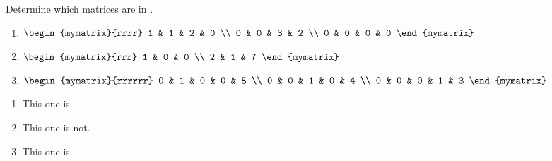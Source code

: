 \begin{enumialphparenastyle}
\begin{ex} Determine which matrices are in {\ef}. 

\begin{enumerate}
\item $\begin{mymatrix}{rrrr}
1 & 1 & 2 & 0 \\
0 & 0 & 3 & 2 \\
0 & 0 & 0 & 0
\end{mymatrix} $

\item $\begin{mymatrix}{rrr}
1 & 0 & 0 \\
2 & 1 & 7
\end{mymatrix} $

\item $\begin{mymatrix}{rrrrrr}
0 & 1 & 0 & 0 & 5 \\
0 & 0 & 1 & 0 & 4 \\
0 & 0 & 0 & 1 & 3
\end{mymatrix} $
\end{enumerate}
\begin{sol}
\begin{enumerate}
\item This one is.
\item This one is not.
\item This one is.
\end{enumerate}
\end{sol}
\end{ex}


\end{enumialphparenastyle}
